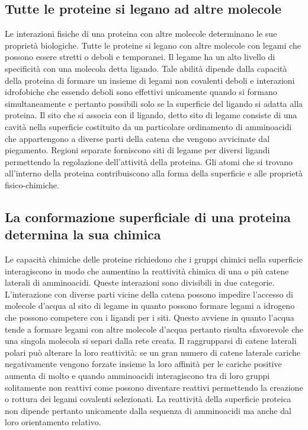 \subsection{Tutte le proteine si legano ad altre molecole}
Le interazioni fisiche di una proteina con altre molecole determinano le sue propriet\`a biologiche. Tutte le proteine si legano con altre molecole con legami che possono essere stretti
o deboli e temporanei. Il legame ha un alto livello di specificit\`a con una molecola detta ligando. Tale abilit\`a dipende dalla capacit\`a della proteina di formare un insieme di 
legami non covalenti deboli e interazioni idrofobiche che essendo deboli sono effettivi unicamente quando si formano simultaneamente e pertanto possibili solo se la superficie del 
ligando si adatta alla proteina. Il sito che si associa con il ligando, detto sito di legame consiste di una cavit\`a nella superficie costituito da un particolare ordinamento di 
amminoacidi che appartengono a diverse parti della catena che vengono avvicinate dal piegamento. Regioni separate forniscono siti di legame per diversi ligandi permettendo la regolazione
dell'attivit\`a della proteina. Gli atomi che si trovano all'interno della proteina contribuiscono alla forma della superficie e alle propriet\`a fisico-chimiche. 
\subsection{La conformazione superficiale di una proteina determina la sua chimica}
Le capacit\`a chimiche delle proteine richiedono che i gruppi chimici nella superficie interagiscono in modo che aumentino la reattivit\`a chimica di una o pi\`u catene laterali di 
amminoacidi. Queste interazioni sono divisibili in due categorie. L'interazione con diverse parti vicine della catena possono impedire l'accesso di molecole d'acqua al sito di legame in
quanto possono formare legami a idrogeno che possono competere con i ligandi per i siti. Questo avviene in quanto l'acqua tende a formare legami con altre molecole d'acqua pertanto 
risulta sfavorevole che una singola molecola si separi dalla rete creata. Il raggrupparsi di catene laterali polari pu\`o alterare la loro reattivit\`a: se un gran numero di catene
laterale cariche negativamente vengono forzate insieme la loro affinit\`a per le cariche positive aumenta di molto e quando amminoacidi interagiscono tra di loro gruppi solitamente 
non reattivi come  possono diventare reattivi permettendo la creazione o rottura dei legami covalenti selezionati. La reattivit\`a della superficie proteica non dipende 
pertanto unicamente dalla sequenza di amminoacidi ma anche dal loro orientamento relativo. 
